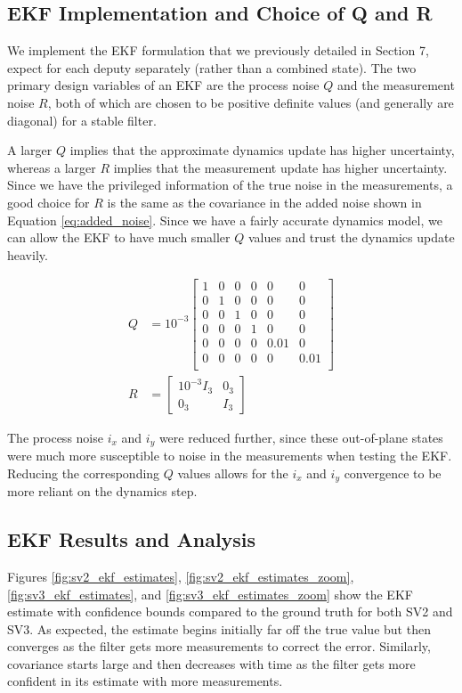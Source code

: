 \subsection{EKF Implementation and Choice of Q and R}

We implement the EKF formulation \cite{kalman1960new} that we previously detailed in Section 7, expect for each deputy separately (rather than a combined state). The two primary design variables of an EKF are the process noise $Q$ and the measurement noise $R$, both of which are chosen to be positive definite values (and generally are diagonal) for a stable filter.

A larger $Q$ implies that the approximate dynamics update has higher uncertainty, whereas a larger $R$ implies that the measurement update has higher uncertainty. Since we have the privileged information of the true noise in the measurements, a good choice for $R$ is the same as the covariance in the added noise shown in Equation \ref{eq:added_noise}. Since we have a fairly accurate dynamics model, we can allow the EKF to have much smaller $Q$ values and trust the dynamics update heavily.

\begin{align}
    Q &= 10^{-3}\begin{bmatrix}
        1 & 0 & 0 & 0 & 0 & 0 \\
        0 & 1 & 0 & 0 & 0 & 0 \\
        0 & 0 & 1 & 0 & 0 & 0 \\
        0 & 0 & 0 & 1 & 0 & 0 \\
        0 & 0 & 0 & 0 & 0.01 & 0 \\
        0 & 0 & 0 & 0 & 0 & 0.01 \\
    \end{bmatrix}\\
    R &= \begin{bmatrix}
        10^{-3}I_3 & 0_3 \\ 0_3 & I_3 
    \end{bmatrix}
\end{align}

The process noise $i_x$ and $i_y$ were reduced further, since these out-of-plane states were much more susceptible to noise in the measurements when testing the EKF. Reducing the corresponding $Q$ values allows for the $i_x$ and $i_y$ convergence to be more reliant on the dynamics step.

\subsection{EKF Results and Analysis}
Figures \ref{fig:sv2_ekf_estimates}, \ref{fig:sv2_ekf_estimates_zoom}, \ref{fig:sv3_ekf_estimates}, and \ref{fig:sv3_ekf_estimates_zoom} show the EKF estimate with confidence bounds compared to the ground truth for both SV2 and SV3. As expected, the estimate begins initially far off the true value but then converges as the filter gets more measurements to correct the error. Similarly, covariance starts large and then decreases with time as the filter gets more confident in its estimate with more measurements.  


